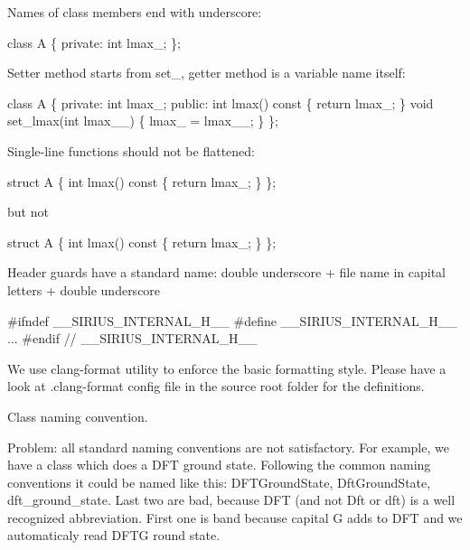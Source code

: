 \begin{DoxyItemize}
\item Names of class members end with underscore\+: 
\begin{DoxyCode}
\textcolor{keyword}{class }A
\{
    \textcolor{keyword}{private}:
        \textcolor{keywordtype}{int} lmax\_;
\};
\end{DoxyCode}

\item Setter method starts from set\+\_\+, getter method is a variable name itself\+: 
\begin{DoxyCode}
\textcolor{keyword}{class }A
\{
    \textcolor{keyword}{private}:
        \textcolor{keywordtype}{int} lmax\_;
    \textcolor{keyword}{public}:
        \textcolor{keywordtype}{int} lmax()\textcolor{keyword}{ const}
\textcolor{keyword}{        }\{
            \textcolor{keywordflow}{return} lmax\_;
        \}
        \textcolor{keywordtype}{void} set\_lmax(\textcolor{keywordtype}{int} lmax\_\_)
        \{
            lmax\_ = lmax\_\_;
        \}
\};
\end{DoxyCode}

\item Single-\/line functions should not be flattened\+: 
\begin{DoxyCode}
\textcolor{keyword}{struct }A
\{
    \textcolor{keywordtype}{int} lmax()\textcolor{keyword}{ const}
\textcolor{keyword}{    }\{
        \textcolor{keywordflow}{return} lmax\_;
    \}
\};
\end{DoxyCode}
 but not 
\begin{DoxyCode}
\textcolor{keyword}{struct }A
\{
    \textcolor{keywordtype}{int} lmax()\textcolor{keyword}{ const }\{ \textcolor{keywordflow}{return} lmax\_; \}
\};
\end{DoxyCode}

\item Header guards have a standard name\+: double underscore + file name in capital letters + double underscore 
\begin{DoxyCode}
\textcolor{preprocessor}{#ifndef \_\_SIRIUS\_INTERNAL\_H\_\_}
\textcolor{preprocessor}{#define \_\_SIRIUS\_INTERNAL\_H\_\_}
...
#endif \textcolor{comment}{// \_\_SIRIUS\_INTERNAL\_H\_\_}
\end{DoxyCode}
 We use clang-\/format utility to enforce the basic formatting style. Please have a look at .clang-\/format config file in the source root folder for the definitions.
\end{DoxyItemize}

Class naming convention.

Problem\+: all \textquotesingle{}standard\textquotesingle{} naming conventions are not satisfactory. For example, we have a class which does a D\+F\+T ground state. Following the common naming conventions it could be named like this\+: D\+F\+T\+Ground\+State, Dft\+Ground\+State, dft\+\_\+ground\+\_\+state. Last two are bad, because D\+F\+T (and not Dft or dft) is a well recognized abbreviation. First one is band because capital G adds to D\+F\+T and we automaticaly read D\+F\+T\+G round state.

